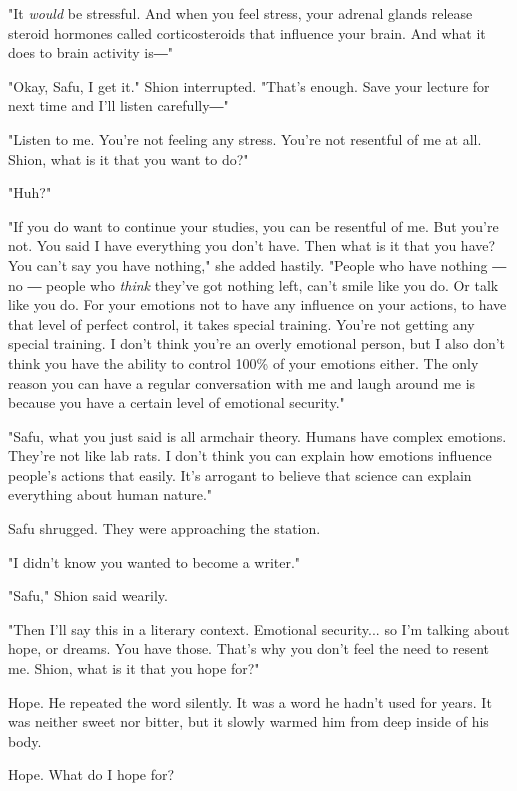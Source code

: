 "It \emph{would} be stressful. And when you feel stress, your adrenal glands
release steroid hormones called corticosteroids that influence your
brain. And what it does to brain activity is―"

"Okay, Safu, I get it." Shion interrupted. "That's enough. Save your
lecture for next time and I'll listen carefully―"

"Listen to me. You're not feeling any stress. You're not resentful of me
at all. Shion, what is it that you want to do?"

"Huh?"

"If you do want to continue your studies, you can be resentful of me.
But you're not. You said I have everything you don't have. Then what is
it that you have? You can't say you have nothing," she added hastily.
"People who have nothing ― no ― people who \emph{think} they've got nothing
left, can't smile like you do. Or talk like you do. For your emotions
not to have any influence on your actions, to have that level of perfect
control, it takes special training. You're not getting any special
training. I don't think you're an overly emotional person, but I also
don't think you have the ability to control 100\% of your emotions
either. The only reason you can have a regular conversation with me and
laugh around me is because you have a certain level of emotional
security."

"Safu, what you just said is all armchair theory. Humans have complex
emotions. They're not like lab rats. I don't think you can explain how
emotions influence people's actions that easily. It's arrogant to
believe that science can explain everything about human nature."

Safu shrugged. They were approaching the station.

"I didn't know you wanted to become a writer."

"Safu," Shion said wearily.

"Then I'll say this in a literary context. Emotional security... so I'm
talking about hope, or dreams. You have those. That's why you don't feel
the need to resent me. Shion, what is it that you hope for?"

\mybreak

Hope. He repeated the word silently. It was a word he hadn't used for
years. It was neither sweet nor bitter, but it slowly warmed him from
deep inside of his body.

Hope. What do I hope for?

\myspace

